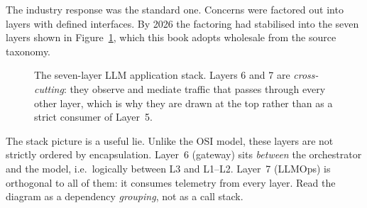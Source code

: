 \documentclass[11pt,twoside,openright]{book}
\theoremstyle{definition}
\theoremstyle{plain}
\theoremstyle{remark}
\begin{document}
The industry response was the standard one. Concerns were factored out into
layers with defined interfaces. By 2026 the factoring had stabilised into the
seven layers shown in Figure~\ref{fig:stack}, which this book adopts wholesale
from the source taxonomy.

\begin{figure}[H]
\centering
{}
\caption{The seven-layer LLM application stack. Layers 6 and 7 are
\emph{cross-cutting}: they observe and mediate traffic that passes through every
other layer, which is why they are drawn at the top rather than as a strict
consumer of Layer~5.}
\label{fig:stack}
\end{figure}

\begin{caution}
The stack picture is a useful lie. Unlike the OSI model, these layers are not
strictly ordered by encapsulation. Layer~6 (gateway) sits \emph{between} the
orchestrator and the model, i.e.\ logically between L3 and L1--L2. Layer~7
(LLMOps) is orthogonal to all of them: it consumes telemetry from every layer.
Read the diagram as a dependency \emph{grouping}, not as a call stack.
\end{caution}
\end{document}
